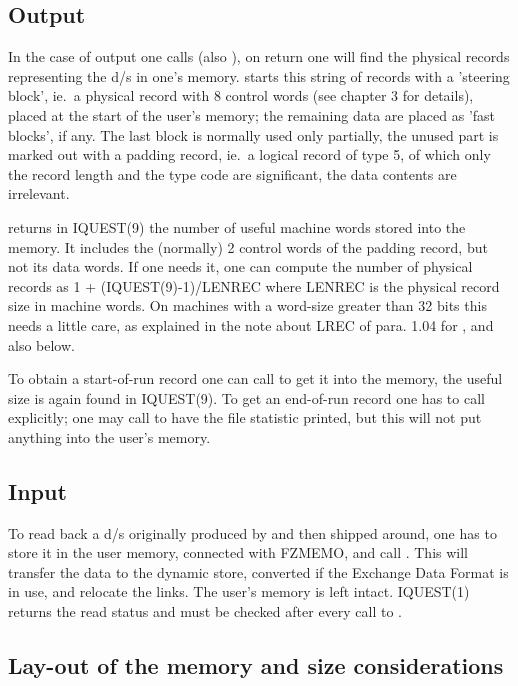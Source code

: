 {\subsection*{Output}

In the case of output one calls  (also ),
on return one will find the physical records representing
the d/s in one's memory.
 starts this string of records with a 'steering block',
ie.~a physical record with 8 control words
(see chapter 3 for details),
placed at the start of the user's memory;
the remaining data are placed as 'fast blocks', if any.
The last block is normally used only partially,
the unused part is marked out with a padding record,
ie.~a logical record of type 5,
of which only the record length and the type code are significant,
the data contents are irrelevant.

 returns in IQUEST(9) the number of useful machine words
stored into the memory.
It includes the (normally) 2 control words of the padding record,
but not its data words.
If one needs it,
one can compute the number of physical records
as  1 + (IQUEST(9)-1)/LENREC  where LENREC
is the physical record size in machine words.
On machines with a word-size greater than 32 bits this needs
a little care,
as explained in the note about LREC of para. 1.04 for ,
and also below.

To obtain a start-of-run record one can call 
to get it into the memory, the useful size is again found
in IQUEST(9).
To get an end-of-run record one has to call  explicitly;
one may call  to have the file statistic printed,
but this will not put anything into the user's memory.

\subsection*{Input}

To read back a d/s originally produced by 
and then shipped around,
one has to store it in the user memory,
connected with FZMEMO,
and call .
This will transfer the data to the dynamic store,
converted if the Exchange Data Format is in use,
and relocate the links.
The user's memory is left intact.
IQUEST(1) returns the read status and must be checked after
every call to .

\subsection*{Lay-out of the memory and size considerations}

}
